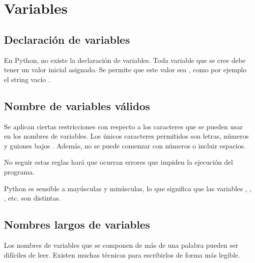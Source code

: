 \chapter{Variables}

\section{Declaración de variables}

En Python, no existe la declaración de variables.
Toda variable que se cree debe tener un valor inicial asignado.
Se permite que este valor sea , como por ejemplo el string vacío \ttt{\qq \qq}.


\section{Nombre de variables válidos}

Se aplican ciertas restricciones con respecto a los caracteres que se pueden usar en los nombres de variables.
Los únicos caracteres permitidos son letras, números y guiones bajos \ttt{\_}.
Además, no se puede comenzar con números o incluir espacios.

No seguir estas reglas hará que ocurran errores que impiden la ejecución del programa.


Python es sensible a mayúsculas y minúsculas, lo que significa que las variables , , , etc. son distintas.


\section{Nombres largos de variables}

Los nombres de variables que se componen de más de una palabra pueden ser difíciles de leer.
Existen muchas técnicas para escribirlos de forma más legible.

